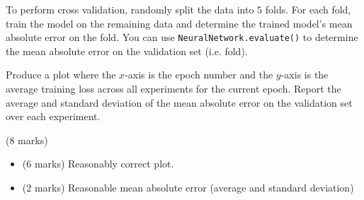\documentclass[12pt]{article}
\begin{document}
\begin{enumerate}[font=\Large,label=(\alph*)]
To perform cross validation, randomly split the data into $5$ folds. For each fold, train the model on the remaining data and determine the trained model's mean absolute error on the fold. You can use \texttt{NeuralNetwork.evaluate()} to determine the mean absolute error on the validation set (i.e. fold). 

Produce a plot where the $x$-axis is the epoch number and the $y$-axis is the average training loss across all experiments for the current epoch. Report the average and standard deviation of the mean absolute error on the validation set over each experiment.

\begin{markscheme}
(8 marks)

\begin{itemize}
    \item (6 marks) Reasonably correct plot.
    \item (2 marks) Reasonable mean absolute error (average and standard deviation)
\end{itemize}

\end{markscheme}



\end{enumerate}
\end{document}

